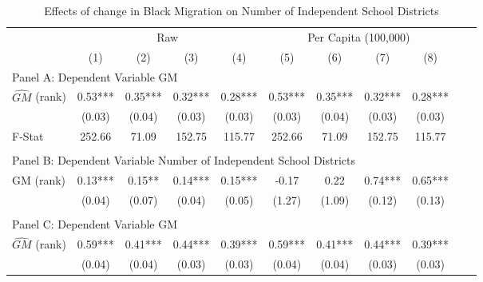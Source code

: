  \begin{table}[htbp]\centering {} \begin{threeparttable} \caption{Effects of change in Black Migration on Number of Independent School Districts} \begin{tabular}{l*{10}{c}} \toprule
                &\multicolumn{4}{c}{Raw}                                    &\multicolumn{4}{c}{Per Capita (100,000)}                   \\\cmidrule(lr){2-5}\cmidrule(lr){6-9}
                &\multicolumn{1}{c}{(1)}   &\multicolumn{1}{c}{(2)}   &\multicolumn{1}{c}{(3)}   &\multicolumn{1}{c}{(4)}   &\multicolumn{1}{c}{(5)}   &\multicolumn{1}{c}{(6)}   &\multicolumn{1}{c}{(7)}   &\multicolumn{1}{c}{(8)}   \\
\cmidrule(lr){1-9}
\multicolumn{8}{l}{Panel A: Dependent Variable GM}\\
\cmidrule(lr){1-9}
$\hat{GM}$ (rank)&       0.53***&       0.35***&       0.32***&       0.28***&       0.53***&       0.35***&       0.32***&       0.28***\\
                &     (0.03)   &     (0.04)   &     (0.03)   &     (0.03)   &     (0.03)   &     (0.04)   &     (0.03)   &     (0.03)   \\
\midrule
F-Stat          &     252.66   &      71.09   &     152.75   &     115.77   &     252.66   &      71.09   &     152.75   &     115.77   \\
\cmidrule[\heavyrulewidth](lr){1-9} \\ \cmidrule[\heavyrulewidth](lr){1-9}
\multicolumn{8}{l}{Panel B: Dependent Variable Number of Independent School Districts}\\
\cmidrule(lr){1-9}
GM  (rank)      &       0.13***&       0.15** &       0.14***&       0.15***&      -0.17   &       0.22   &       0.74***&       0.65***\\
                &     (0.04)   &     (0.07)   &     (0.04)   &     (0.05)   &     (1.27)   &     (1.09)   &     (0.12)   &     (0.13)   \\
\cmidrule[\heavyrulewidth](lr){1-9} \\ \cmidrule[\heavyrulewidth](lr){1-9}
\multicolumn{8}{l}{Panel C: Dependent Variable GM}\\
\cmidrule(lr){1-9}
$\hat{GM}$ (rank)&       0.59***&       0.41***&       0.44***&       0.39***&       0.59***&       0.41***&       0.44***&       0.39***\\
                &     (0.04)   &     (0.04)   &     (0.03)   &     (0.03)   &     (0.04)   &     (0.04)   &     (0.03)   &     (0.03)   \\

\end{tabular}
\end{threeparttable}
\end{table}
